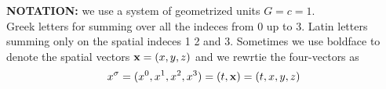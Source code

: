 \textbf{NOTATION:} we use a system of geometrized units $G=c=1$.\\
Greek letters for summing over all the indeces from 0 up to 3.
Latin letters summing only on the spatial indeces 1 2 and 3.
Sometimes we use boldface to denote the spatial vectors $\vb{x} =(x,y,z)$ and we rewrtie the four-vectors as 
\[
x^{\sigma} = (x^{0},x^{1}, x^{2},x^{3}) = (t,\vb{x}) = (t,x,y,z)
\]
